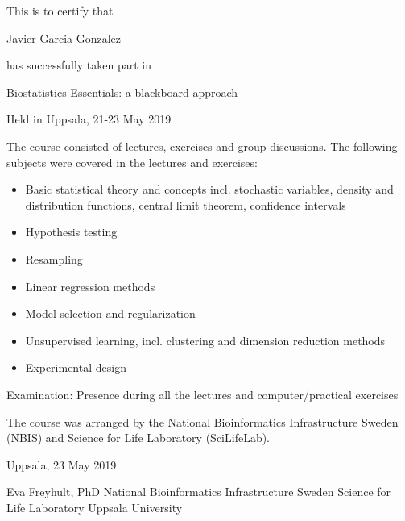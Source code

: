 \documentclass[12pt]{article}\usepackage[]{graphicx}\usepackage[]{color}
\newcommand{\courseName}{Biostatistics Essentials: a blackboard approach}
\newcommand{\courseLocation}{Uppsala}
\newcommand{\courseDate}{21-23 May 2019}
\newcommand{\courseLastDay}{23 May 2019}
\newcommand{\courseExaminer}{Eva Freyhult, PhD}
\begin{document}
\large
This is to certify that 


\LARGE
Javier Garcia Gonzalez

\large
has successfully taken part in \newline

\LARGE
\begin{center}{\courseName}  \end{center} 


\large
\begin{center} Held in {\courseLocation}, {\courseDate} \end{center} 

\vspace{5mm}
\normalsize
The course consisted of lectures, exercises and group discussions. The following subjects were covered in the lectures and exercises:
\begin{itemize}
  \item Basic statistical theory and concepts incl. stochastic variables, density and distribution functions, central limit theorem, confidence intervals
  \item Hypothesis testing
  \item Resampling
  \item Linear regression methods
  \item Model selection and regularization
  \item Unsupervised learning, incl. clustering and dimension reduction methods
  \item Experimental design
\end{itemize}




\vspace{5mm}
Examination: \newline
Presence during all the lectures and computer/practical exercises

\vspace{8mm}
The course was arranged by the National Bioinformatics Infrastructure Sweden (NBIS) and Science for Life Laboratory (SciLifeLab).


\vspace{8mm}
{\courseLocation}, {\courseLastDay}
\vspace{22mm}


{\courseExaminer} \newline
\small
National Bioinformatics Infrastructure Sweden \newline
Science for Life Laboratory \newline
Uppsala University \newline
\end{document}
